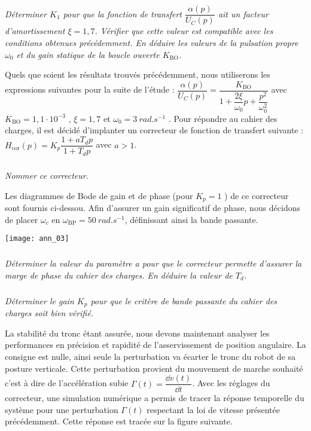 \begin{multicols}{2}
\subparagraph{} \textit{Déterminer $K_1$ pour que la fonction de transfert $\dfrac{\alpha (p)}{U_C(p)}$
 ait un facteur d'amortissement $\xi=1,7$.
Vérifier que cette valeur est compatible avec les conditions obtenues précédemment. En déduire les
valeurs de la pulsation propre$\omega_0$ et du gain statique de la boucle ouverte $K_{\text{BO}}$.}
\ifprof
\begin{corrige}
\end{corrige}
\else
\fi

Quels que soient les résultats trouvés précédemment, nous utiliserons les expressions suivantes pour la suite
de l'étude : $\dfrac{\alpha (p)}{U_C(p)} = \dfrac{K_{\text{BO}}}{1+\dfrac{2\xi}{\omega_0}p+\dfrac{p^2}{\omega_0^2}}$
avec $K_{\text{BO}}=1,1\cdot 10^{-3}$ , $\xi=1,7$ et $\omega_0=\SI{3}{rad.s^{-1}}$ . Pour répondre au cahier des
charges, il est décidé d'implanter un correcteur de fonction de transfert suivante : $H_{\text{cor}} (p)=K_p \dfrac{1+aT_d p}{1+T_d p}$ avec $a>1$.

\subparagraph{} \textit{Nommer ce correcteur.}
\ifprof
\begin{corrige}
\end{corrige}
\else
\fi

Les diagrammes de Bode de gain et de phase (pour $K_p=1$ ) de ce correcteur sont fournis ci-dessou. Afin
d'assurer un gain significatif de phase, nous décidons de placer $\omega_c$ en $\omega_{\text{BP}}=\SI{50}{rad.s^{-1}}$, définissant ainsi la bande passante.

\begin{center}
\texttt{[image: ann\_03]}
\end{center}

\subparagraph{} \textit{Déterminer la valeur du paramètre a pour que le correcteur permette d'assurer la marge de phase
du cahier des charges. En déduire la valeur de $T_d$.}
\ifprof
\begin{corrige}
\end{corrige}
\else
\fi


\subparagraph{} \textit{Déterminer le gain $K_p$ pour que le critère de bande passante du cahier des charges soit bien vérifié.}
\ifprof
\begin{corrige}
\end{corrige}
\else
\fi

La stabilité du tronc étant assurée, nous devons maintenant analyser les performances en précision et rapidité
de l'asservissement de position angulaire. La consigne est nulle, ainsi seule la perturbation va écarter le tronc
du robot de sa posture verticale. Cette perturbation provient du mouvement de marche souhaité c'est à dire de
l'accélération subie $\Gamma(t)=\dfrac{\dd v(t)}{\dd t}$. Avec les réglages du correcteur, une simulation numérique a permis de tracer la réponse temporelle du système pour une perturbation $\Gamma(t)$ respectant la loi de vitesse présentée précédemment.
Cette réponse est tracée sur la figure suivante.


\end{multicols}
